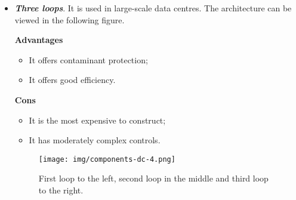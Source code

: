 \begin{itemize}
	\item \textbf{\emph{Three loops}}. It is used in large-scale data centres. The architecture can be viewed in the following figure.
	\begin{flushleft}
		\textcolor{Green3}{ \textbf{Advantages}}
	\end{flushleft}
	\begin{itemize}
		\item It offers contaminant protection;
		\item It offers good efficiency.
	\end{itemize}
	\begin{flushleft}
		\textcolor{Red2}{ \textbf{Cons}}
	\end{flushleft}
	\begin{itemize}
		\item It is the most expensive to construct;
		\item It has moderately complex controls.
	\end{itemize}
	\begin{figure}[!htp]
		\centering
		\texttt{[image: img/components-dc-4.png]}
		\caption*{First loop to the left, second loop in the middle and third loop to the right.}
	\end{figure}
\end{itemize}

\newpage


